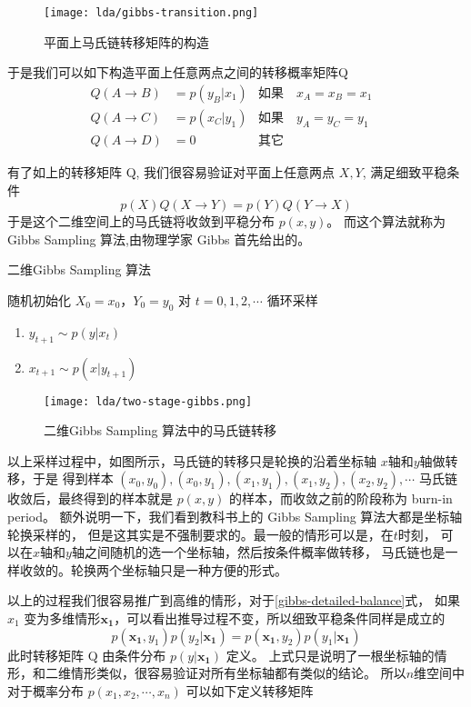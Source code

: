 \begin{figure}[h]
\centering
\texttt{[image: lda/gibbs-transition.png]}
\caption{平面上马氏链转移矩阵的构造}
\end{figure}

于是我们可以如下构造平面上任意两点之间的转移概率矩阵Q
\begin{align*}
Q(A\rightarrow B) & = p(y_B|x_1) & \text{如果} \quad x_A=x_B=x_1 & \\
Q(A\rightarrow C) & = p(x_C|y_1) & \text{如果} \quad y_A=y_C=y_1 & \\
Q(A\rightarrow D) & = 0          & \text{其它} &
\end{align*}


有了如上的转移矩阵 Q, 我们很容易验证对平面上任意两点 $X,Y$, 满足细致平稳条件
$$ p(X)Q(X\rightarrow Y) = p(Y) Q(Y\rightarrow X) $$
于是这个二维空间上的马氏链将收敛到平稳分布 $p(x,y)$。
而这个算法就称为 Gibbs Sampling 算法,由物理学家 Gibbs 首先给出的。

\begin{algorithm}[htb]
\caption{二维Gibbs Sampling 算法}
\begin{algorithmic}[1]
\STATE 随机初始化 $X_0 = x_0，Y_0=y_0$
\STATE 对 $t=0,1,2,\cdots$ 循环采样
\begin{enumerate}
\item  $y_{t+1} \sim p(y|x_{t})$
\item  $x_{t+1} \sim p(x|y_{t+1})$
\end{enumerate}
\end{algorithmic}
\end{algorithm}
\begin{figure}[htbp]
\centering
\texttt{[image: lda/two-stage-gibbs.png]}
\caption{二维Gibbs Sampling 算法中的马氏链转移}
\end{figure}

以上采样过程中，如图所示，马氏链的转移只是轮换的沿着坐标轴 $x$轴和$y$轴做转移，于是
得到样本 $(x_0,y_0), (x_0,y_1), (x_1,y_1), (x_1,y_2),(x_2,y_2), \cdots $
马氏链收敛后，最终得到的样本就是 $p(x,y)$ 的样本，而收敛之前的阶段称为 burn-in period。
额外说明一下，我们看到教科书上的 Gibbs Sampling 算法大都是坐标轴轮换采样的，
但是这其实是不强制要求的。最一般的情形可以是，在$t$时刻，
可以在$x$轴和$y$轴之间随机的选一个坐标轴，然后按条件概率做转移，
马氏链也是一样收敛的。轮换两个坐标轴只是一种方便的形式。

以上的过程我们很容易推广到高维的情形，对于\eqref{gibbs-detailed-balance}式，
如果$x_1$ 变为多维情形$\mathbf{x_1}$，可以看出推导过程不变，所以细致平稳条件同样是成立的
\begin{equation}
\label{gibbs-detailed-balance-n-dimen}
p(\mathbf{x_1},y_1)p(y_2|\mathbf{x_1}) =  p(\mathbf{x_1},y_2)p(y_1|\mathbf{x_1})
\end{equation}
此时转移矩阵 Q 由条件分布 $p(y|\mathbf{x_1})$ 定义。
上式只是说明了一根坐标轴的情形，和二维情形类似，很容易验证对所有坐标轴都有类似的结论。
所以$n$维空间中对于概率分布 $p(x_1,x_2,\cdots, x_n)$ 可以如下定义转移矩阵


